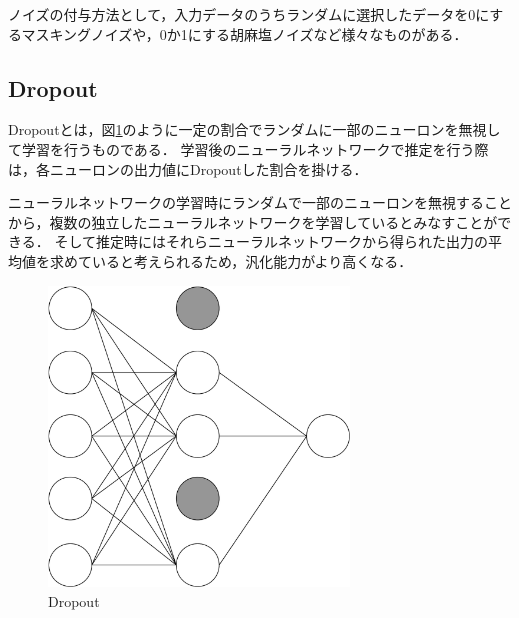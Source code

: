 ノイズの付与方法として，入力データのうちランダムに選択したデータを0にするマスキングノイズや，0か1にする胡麻塩ノイズなど様々なものがある．

\subsection{Dropout}
Dropoutとは，図\ref{dropout}のように一定の割合でランダムに一部のニューロンを無視して学習を行うものである．
学習後のニューラルネットワークで推定を行う際は，各ニューロンの出力値にDropoutした割合を掛ける．

ニューラルネットワークの学習時にランダムで一部のニューロンを無視することから，複数の独立したニューラルネットワークを学習しているとみなすことができる．
そして推定時にはそれらニューラルネットワークから得られた出力の平均値を求めていると考えられるため，汎化能力がより高くなる．

\begin{figure}[hbtp]
  \centering
  \includegraphics[bb=0 0 507 506, width=8cm]{Figures/dropout.pdf}
  \caption{Dropout}
  \label{dropout}
\end{figure}

